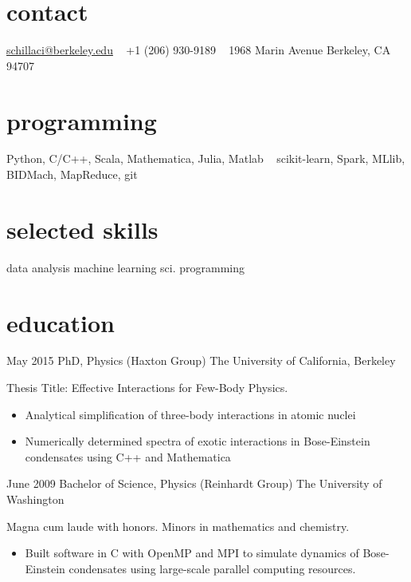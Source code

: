 \documentclass[]{friggeri-cv} %
\begin{document}


\begin{aside} %
\section{contact}
\href{mailto:schillaci@berkeley.edu}{schillaci@berkeley.edu}
~
+1 (206) 930-9189
~
1968 Marin Avenue
Berkeley, CA 94707
\section{programming}
Python, C/C++, Scala, Mathematica, Julia, Matlab
~
scikit-learn, Spark, MLlib, BIDMach, MapReduce, git
\section{selected skills}
data analysis
machine learning
sci. programming
\end{aside}


\section{education}

\begin{entrylist}
\entry
{May 2015}
{PhD, {\normalfont  Physics (Haxton Group)}}
{The University of California, Berkeley}
{Thesis Title: Effective Interactions for Few-Body Physics. 
\begin{itemize}
\item Analytical simplification of three-body interactions in atomic nuclei 
\item Numerically determined spectra of exotic interactions in Bose-Einstein condensates using C++ and Mathematica
\end{itemize}}
\entry
{June 2009}
{Bachelor of Science, {\normalfont Physics (Reinhardt Group)}}
{The University of Washington}
{Magna cum laude with honors. Minors in mathematics and chemistry. 
\begin{itemize}
\item Built software in C with OpenMP and MPI to simulate dynamics of Bose-Einstein condensates using large-scale parallel computing resources.
\end{itemize}}
\end{entrylist}
\end{document}

